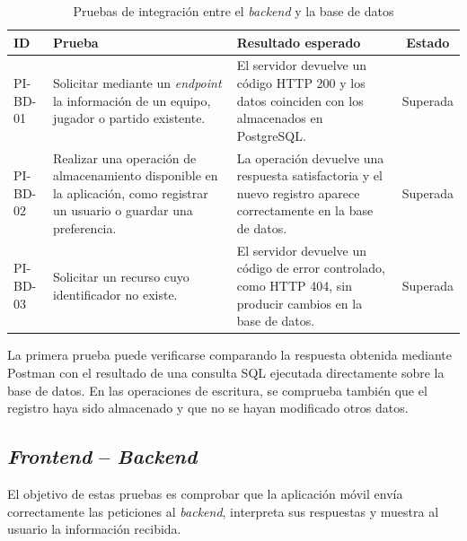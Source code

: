 \begin{table}[H]
    \centering
    \small
    \begin{tabularx}{\textwidth}{|l|X|X|c|}
        \hline
        \textbf{ID} & \textbf{Prueba} & \textbf{Resultado esperado} &
        \textbf{Estado} \\ \hline

        PI-BD-01 &
        Solicitar mediante un \textit{endpoint} la información de un equipo,
        jugador o partido existente. &
        El servidor devuelve un código HTTP 200 y los datos coinciden con los
        almacenados en PostgreSQL. &
        Superada \\ \hline

        PI-BD-02 &
        Realizar una operación de almacenamiento disponible en la aplicación,
        como registrar un usuario o guardar una preferencia. &
        La operación devuelve una respuesta satisfactoria y el nuevo registro
        aparece correctamente en la base de datos. &
        Superada \\ \hline

        PI-BD-03 &
        Solicitar un recurso cuyo identificador no existe. &
        El servidor devuelve un código de error controlado, como HTTP 404, sin
        producir cambios en la base de datos. &
        Superada \\ \hline
    \end{tabularx}
    \caption{Pruebas de integración entre el \textit{backend} y la base de datos}
    \label{tab:pruebas-backend-bd}
\end{table}

La primera prueba puede verificarse comparando la respuesta obtenida mediante
Postman con el resultado de una consulta SQL ejecutada directamente sobre la
base de datos. En las operaciones de escritura, se comprueba también que el
registro haya sido almacenado y que no se hayan modificado otros datos.

\subsection{\textit{Frontend} -- \textit{Backend}}

El objetivo de estas pruebas es comprobar que la aplicación móvil envía
correctamente las peticiones al \textit{backend}, interpreta sus respuestas y
muestra al usuario la información recibida.

